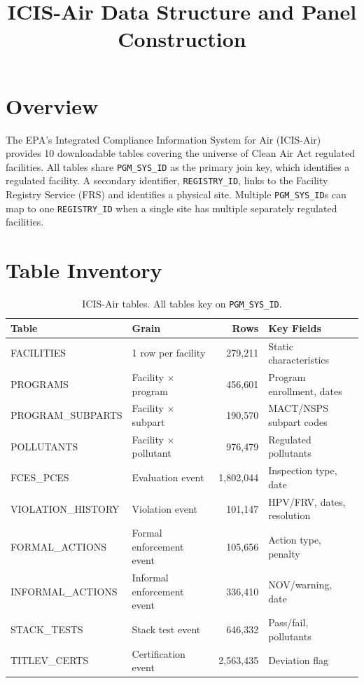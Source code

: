 \documentclass[11pt]{article}
\title{ICIS-Air Data Structure and Panel Construction}
\author{}
\date{}
\begin{document}
\maketitle

\section{Overview}

The EPA's Integrated Compliance Information System for Air (ICIS-Air) provides 10 downloadable tables covering the universe of Clean Air Act regulated facilities. All tables share \texttt{PGM\_SYS\_ID} as the primary join key, which identifies a regulated facility. A secondary identifier, \texttt{REGISTRY\_ID}, links to the Facility Registry Service (FRS) and identifies a physical site. Multiple \texttt{PGM\_SYS\_ID}s can map to one \texttt{REGISTRY\_ID} when a single site has multiple separately regulated facilities.

\section{Table Inventory}

\begin{table}[H]
\centering
\begin{tabular}{llrl}
\toprule
Table & Grain & Rows & Key Fields \\
\midrule
FACILITIES & 1 row per facility & 279,211 & Static characteristics \\
PROGRAMS & Facility $\times$ program & 456,601 & Program enrollment, dates \\
PROGRAM\_SUBPARTS & Facility $\times$ subpart & 190,570 & MACT/NSPS subpart codes \\
POLLUTANTS & Facility $\times$ pollutant & 976,479 & Regulated pollutants \\
FCES\_PCES & Evaluation event & 1,802,044 & Inspection type, date \\
VIOLATION\_HISTORY & Violation event & 101,147 & HPV/FRV, dates, resolution \\
FORMAL\_ACTIONS & Formal enforcement event & 105,656 & Action type, penalty \\
INFORMAL\_ACTIONS & Informal enforcement event & 336,410 & NOV/warning, date \\
STACK\_TESTS & Stack test event & 646,332 & Pass/fail, pollutants \\
TITLEV\_CERTS & Certification event & 2,563,435 & Deviation flag \\
\bottomrule
\end{tabular}
\caption{ICIS-Air tables. All tables key on \texttt{PGM\_SYS\_ID}.}
\end{table}
\end{document}
